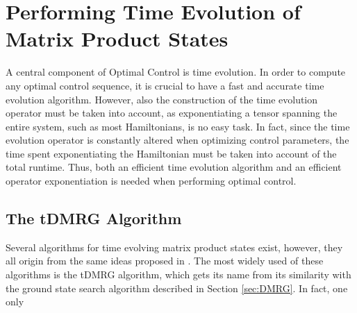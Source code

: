 \chapter{Performing Time Evolution of Matrix Product States}
A central component of Optimal Control is time evolution. In order to compute any optimal control sequence, it is crucial to have a fast and accurate time evolution algorithm. However, also the construction of the time evolution operator must be taken into account, as exponentiating a tensor spanning the entire system, such as most Hamiltonians, is no easy task. In fact, since the time evolution operator is constantly altered when optimizing control parameters, the time spent exponentiating the Hamiltonian must be taken into account of the total runtime. Thus, both an efficient time evolution algorithm and an efficient operator exponentiation is needed when performing optimal control.

\section{The tDMRG Algorithm}
 
Several algorithms for time evolving matrix product states exist, however, they all origin from the same ideas proposed in \cite{Vidal2003,Vidal2004}. The most widely used of these algorithms is the tDMRG algorithm, which gets its name from its similarity with the ground state search algorithm described in Section \ref{sec:DMRG}. In fact, one only 



